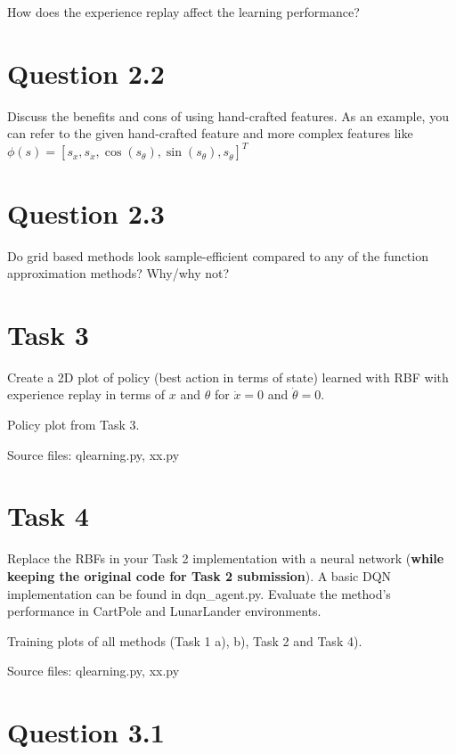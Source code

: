 \documentclass[12pt]{article}
\begin{document}
How does the experience replay affect the learning performance?

\section*{Question 2.2}

Discuss the benefits and cons of using hand-crafted features. As an example, you can refer to 
the given hand-crafted feature and more complex features like
$\phi(s) = [s_x, s_{\dot{x}}, \operatorname{cos}(s_{\theta}), \operatorname{sin}(s_{\theta}), s_{\dot{\theta}}]^T$

\section*{Question 2.3}

Do grid based methods look sample-efficient compared to any of the
function approximation methods? Why/why not?

\section*{Task 3}

Create a 2D plot of policy (best action in terms of state) learned with RBF
with experience replay in terms of $x$ and $\theta$ for $\dot{x}=0$ and $\dot{\theta}=0$.
\newline

Policy plot from Task 3.
\newline

\noindent
Source files: qlearning.py, xx.py 

\section*{Task 4}

Replace the RBFs in your Task 2 implementation with a neural network
(\textbf{while keeping the original code for Task 2 submission}). A basic DQN implementation
can be found in dqn\_agent.py. Evaluate the method’s performance in CartPole and LunarLander
environments.
\newline

Training plots of all methods (Task 1 a), b), Task 2 and Task 4).
\newline

\noindent
Source files: qlearning.py, xx.py 

\section*{Question 3.1}
\end{document}
